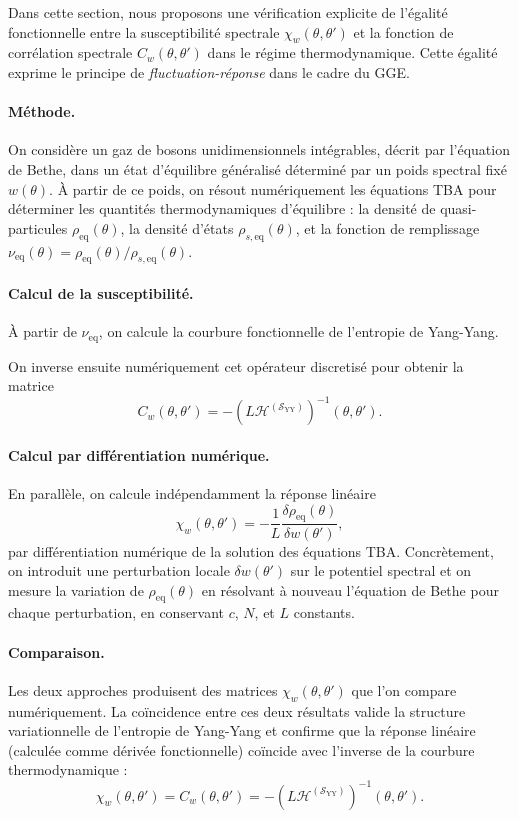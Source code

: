 Dans cette section, nous proposons une vérification explicite de l'égalité fonctionnelle entre la susceptibilité spectrale \( \chi_w(\theta, \theta') \) et la fonction de corrélation spectrale \( C_w(\theta, \theta') \) dans le régime thermodynamique. Cette égalité exprime le principe de \emph{fluctuation-réponse} dans le cadre du GGE.

\paragraph{Méthode.} On considère un gaz de bosons unidimensionnels intégrables, décrit par l’équation de Bethe, dans un état d’équilibre généralisé déterminé par un poids spectral fixé \( w(\theta) \). À partir de ce poids, on résout numériquement les équations TBA pour déterminer les quantités thermodynamiques d'équilibre : la densité de quasi-particules \( \rho_{\mathrm{eq}}(\theta) \), la densité d'états \( \rho_{s,\mathrm{eq}}(\theta) \), et la fonction de remplissage \( \nu_{\mathrm{eq}}(\theta) = \rho_{\mathrm{eq}}(\theta) / \rho_{s,\mathrm{eq}}(\theta) \).

\paragraph{Calcul de la susceptibilité.}
À partir de \( \nu_{\mathrm{eq}} \), on calcule la courbure fonctionnelle de l'entropie de Yang-Yang.

On inverse ensuite numériquement cet opérateur discretisé pour obtenir la matrice
\[
C_w(\theta, \theta') = - \left( L \mathcal{H}^{(\mathcal{S}_{\mathrm{YY}})} \right)^{-1} (\theta, \theta').
\]

\paragraph{Calcul par différentiation numérique.}
En parallèle, on calcule indépendamment la réponse linéaire
\[
\chi_w(\theta, \theta') = - \frac{1}{L} \frac{\delta \rho_{\mathrm{eq}}(\theta)}{\delta w(\theta')},
\]
par différentiation numérique de la solution des équations TBA. Concrètement, on introduit une perturbation locale \( \delta w(\theta') \) sur le potentiel spectral et on mesure la variation de \( \rho_{\mathrm{eq}}(\theta) \) en résolvant à nouveau l’équation de Bethe pour chaque perturbation, en conservant \( c \), \( N \), et \( L \) constants.

\paragraph{Comparaison.}
Les deux approches produisent des matrices \(\chi_w(\theta, \theta')\) que l’on compare numériquement. La coïncidence entre ces deux résultats valide la structure variationnelle de l'entropie de Yang-Yang et confirme que la réponse linéaire (calculée comme dérivée fonctionnelle) coïncide avec l’inverse de la courbure thermodynamique :
\[
\chi_w(\theta, \theta') = C_w(\theta, \theta') = - \left( L \mathcal{H}^{(\mathcal{S}_{\mathrm{YY}})} \right)^{-1} (\theta, \theta').
\]

